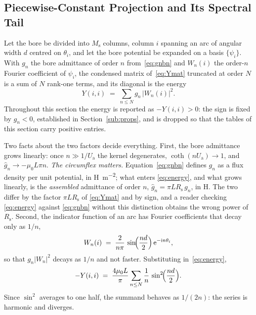 \documentclass[10pt,a4paper,twocolumn]{article}
\newcommand{\Rs}{R_{\mathrm{s}}}
\newcommand{\Ua}{U_{\mathrm{a}}}
\theoremstyle{plain}
\theoremstyle{remark}
\begin{document}
\subsection{Piecewise-Constant Projection and Its Spectral Tail}
\label{sub:p0tail}

Let the bore be divided into $M_{\mathrm{s}}$ columns, column $i$
spanning an arc of angular width $d$ centred on $\theta_i$, and let the
bore potential be expanded on a basis $\{\psi_i\}$. With $g_n$ the bore
admittance of order $n$ from~\eqref{eq:gnbn} and $W_n(i)$ the order-$n$
Fourier coefficient of $\psi_i$, the condensed matrix
of~\eqref{eq:Ymat} truncated at order $N$ is a sum of $N$ rank-one
terms, and its diagonal is the energy
\begin{equation}
Y(i,i)\;=\;\sum_{n\le N} g_n\,\bigl|W_n(i)\bigr|^{2}.
\label{eq:energy}
\end{equation}
Throughout this section the energy is reported as $-Y(i,i)>0$: the sign
is fixed by $g_n<0$, established in Section~\ref{sub:props}, and is
dropped so that the tables of this section carry positive entries.

Two facts about the two factors decide everything. First, the bore
admittance grows linearly: once $n\gg 1/\Ua$ the kernel degenerates,
$\coth(n\Ua)\to1$, and $\hat{g}_n\to-\mu_0 L\pi n$. \emph{The circumflex
matters.} Equation~\eqref{eq:gnbn} defines $g_n$ as a flux density per
unit potential, in \si{\henry\per\metre\squared}; what enters
\eqref{eq:energy}, and what grows linearly, is the \emph{assembled}
admittance of order $n$,
$\hat{g}_n=\pi L\Rs\,g_n$, in \si{\henry}. The two differ by the factor
$\pi L\Rs$ of \eqref{eq:Ymat} and by sign, and a reader checking
\eqref{eq:energy} against \eqref{eq:gnbn} without this distinction
obtains the wrong power of $\Rs$. Second, the indicator
function of an arc has Fourier coefficients that decay only as $1/n$,
\begin{equation}
W_n(i)\;=\;\frac{2}{n\pi}\,\sin\!\Bigl(\frac{nd}{2}\Bigr)\,
\mathrm{e}^{-\mathrm{i}n\theta_i},
\label{eq:Wn_p0}
\end{equation}
so that $g_n|W_n|^{2}$ decays as $1/n$ and not faster. Substituting
in~\eqref{eq:energy},
\begin{equation}
-Y(i,i)\;=\;\frac{4\mu_0 L}{\pi}\sum_{n\le N}\frac{1}{n}\,
\sin^{2}\!\Bigl(\frac{nd}{2}\Bigr).
\label{eq:p0self}
\end{equation}
Since $\sin^{2}$ averages to one half, the summand behaves as $1/(2n)$:
the series is harmonic and diverges.
\end{document}
